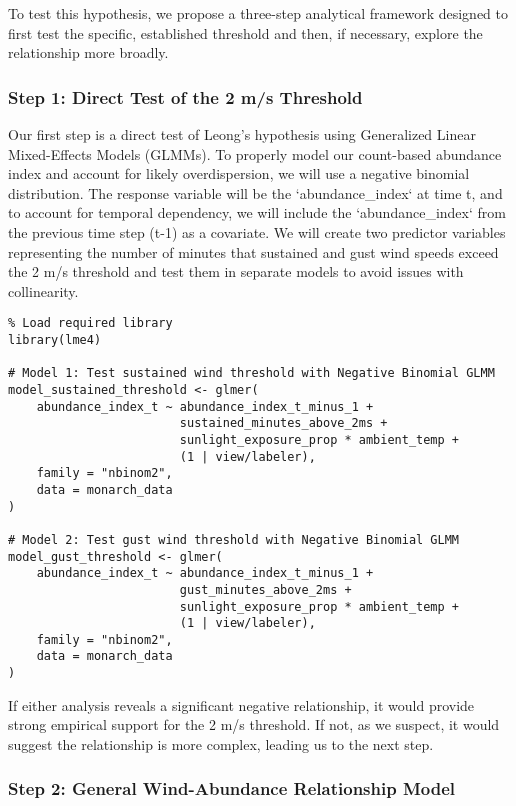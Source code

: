 To test this hypothesis, we propose a three-step analytical framework designed to first test the specific, established threshold and then, if necessary, explore the relationship more broadly.

\subsubsection{Step 1: Direct Test of the 2 m/s Threshold}

Our first step is a direct test of Leong's hypothesis using Generalized Linear Mixed-Effects Models (GLMMs). To properly model our count-based abundance index and account for likely overdispersion, we will use a negative binomial distribution. The response variable will be the `abundance_index` at time t, and to account for temporal dependency, we will include the `abundance_index` from the previous time step (t-1) as a covariate. We will create two predictor variables representing the number of minutes that sustained and gust wind speeds exceed the 2 m/s threshold and test them in separate models to avoid issues with collinearity.

\begin{verbatim}
% Load required library
library(lme4)

# Model 1: Test sustained wind threshold with Negative Binomial GLMM
model_sustained_threshold <- glmer(
    abundance_index_t ~ abundance_index_t_minus_1 + 
                        sustained_minutes_above_2ms + 
                        sunlight_exposure_prop * ambient_temp +
                        (1 | view/labeler),
    family = "nbinom2",
    data = monarch_data
)

# Model 2: Test gust wind threshold with Negative Binomial GLMM
model_gust_threshold <- glmer(
    abundance_index_t ~ abundance_index_t_minus_1 + 
                        gust_minutes_above_2ms + 
                        sunlight_exposure_prop * ambient_temp +
                        (1 | view/labeler),
    family = "nbinom2",
    data = monarch_data
)
\end{verbatim}

If either analysis reveals a significant negative relationship, it would provide strong empirical support for the 2 m/s threshold. If not, as we suspect, it would suggest the relationship is more complex, leading us to the next step.

\subsubsection{Step 2: General Wind-Abundance Relationship Model}


